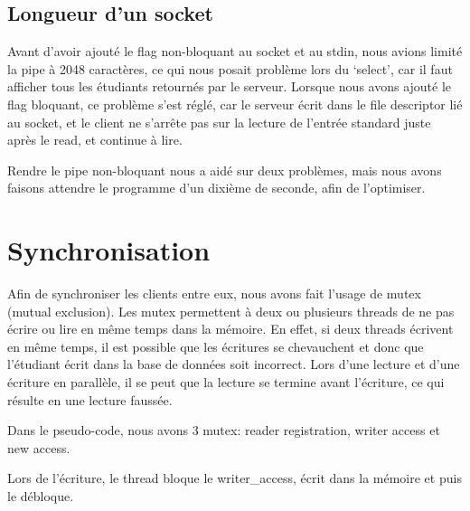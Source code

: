 \documentclass[utf8]{article}
\begin{document}
\begin{large}
\subsection{Longueur d'un socket}
\par
\indent

Avant d'avoir ajouté le flag non-bloquant au socket et au stdin, nous avions
limité la pipe à 2048 caractères, ce qui nous posait problème lors du `select',
car il faut afficher tous les étudiants retournés par le serveur. Lorsque nous avons
ajouté le flag bloquant, ce problème s'est réglé, car le serveur écrit dans le
file descriptor lié au socket, et le client ne s'arrête pas sur la lecture de
l'entrée standard juste après le read, et continue à lire.
\par
Rendre le pipe non-bloquant nous a aidé sur deux problèmes, mais nous avons
faisons attendre le programme d'un dixième de seconde, afin de l'optimiser.
\par

\section{Synchronisation}
\par
\indent

Afin de synchroniser les clients entre eux, nous avons fait l'usage de
mutex (mutual exclusion). Les mutex permettent à deux ou plusieurs threads de ne
pas écrire ou lire en même temps dans la mémoire. En effet, si deux threads
écrivent en même temps, il est possible que les écritures se chevauchent et donc
que l'étudiant écrit dans la base de données soit incorrect. Lors d'une lecture
et d'une écriture en parallèle, il se peut que la lecture se termine avant
l'écriture, ce qui résulte en une lecture faussée.
\par
Dans le pseudo-code, nous avons 3 mutex: reader registration, writer access et
new access. 
\par

Lors de l'écriture, le thread bloque le writer\_access, écrit dans la mémoire et puis le débloque.


\end{large}
\end{document}
